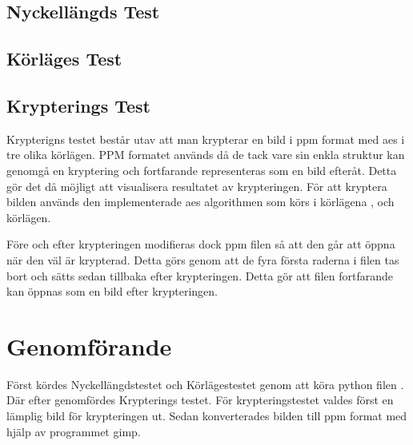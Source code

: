 \subsection{Nyckellängds Test}
\label{sec:nyckellängd-test}


\subsection{Körläges Test}
\label{sec:körlages-test}


\subsection{Krypterings Test} %
\label{sec:krypterings-test}
Krypterigns testet består utav att man krypterar en bild i \gls{ppm} format med \acrshort{aes} i tre olika körlägen.
PPM formatet används då de tack vare sin enkla struktur kan genomgå en kryptering och fortfarande representeras som en bild
efteråt. Detta gör det då möjligt att visualisera resultatet av krypteringen. För att kryptera bilden används den implementerade
\acrshort{aes} algorithmen som körs i körlägena ,  och  körlägen.

Före och efter krypteringen modifieras dock \gls{ppm} filen så att den går att öppna när den väl är krypterad. Detta görs genom att de fyra
första raderna i filen tas bort och sätts sedan tillbaka efter krypteringen. Detta gör att filen fortfarande kan öppnas som en bild
efter krypteringen.

\section{Genomförande} %
Först kördes Nyckellängdstestet och Körlägestestet genom att köra \gls{python} filen . Där efter
genomfördes Krypterings testet. För krypteringstestet valdes först en lämplig bild för krypteringen ut. Sedan
konverterades bilden till \gls{ppm} format med hjälp av programmet \gls{gimp}.